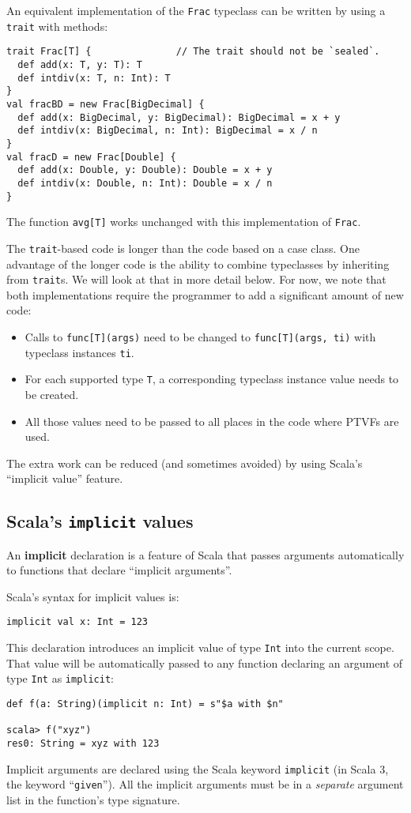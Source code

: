 An equivalent implementation of the \lstinline!Frac! typeclass can
be written by using a \lstinline!trait! with methods:
\begin{lstlisting}
trait Frac[T] {               // The trait should not be `sealed`.
  def add(x: T, y: T): T
  def intdiv(x: T, n: Int): T
}
val fracBD = new Frac[BigDecimal] {
  def add(x: BigDecimal, y: BigDecimal): BigDecimal = x + y
  def intdiv(x: BigDecimal, n: Int): BigDecimal = x / n
}
val fracD = new Frac[Double] {
  def add(x: Double, y: Double): Double = x + y
  def intdiv(x: Double, n: Int): Double = x / n
}
\end{lstlisting}
The function \lstinline!avg[T]! works unchanged with this implementation
of \lstinline!Frac!.

The \lstinline!trait!-based code is longer than the code based on
a case class. One advantage of the longer code is the ability to combine
typeclasses by inheriting from \lstinline!trait!s. We will look at
that in more detail below. For now, we note that both implementations
require the programmer to add a significant amount of new code:
\begin{itemize}
\item Calls to \lstinline!func[T](args)! need to be changed to \lstinline!func[T](args, ti)!
with typeclass instances \lstinline!ti!.
\item For each supported type \lstinline!T!, a corresponding typeclass
instance value needs to be created.
\item All those values need to be passed to all places in the code where
PTVFs are used.
\end{itemize}
The extra work can be reduced (and sometimes avoided) by using Scala\textsf{'}s
\textsf{``}implicit value\textsf{''} feature. 

\subsection{Scala\textsf{'}s \texttt{implicit} values}

An \textbf{implicit } declaration is a feature
of Scala that passes arguments automatically to functions that declare
\textsf{``}implicit arguments\textsf{''}.

Scala\textsf{'}s syntax for implicit values is:
\begin{lstlisting}
implicit val x: Int = 123
\end{lstlisting}
This declaration introduces an implicit value of type \lstinline!Int!
into the current scope. That value will be automatically passed to
any function declaring an argument of type \lstinline!Int! as \lstinline!implicit!:
\begin{lstlisting}
def f(a: String)(implicit n: Int) = s"$a with $n"

scala> f("xyz")
res0: String = xyz with 123
\end{lstlisting}
Implicit arguments are declared using the Scala keyword \lstinline!implicit!
(in Scala 3, the keyword \textsf{``}\lstinline!given!\textsf{''}). All the implicit
arguments must be in a \emph{separate} argument
list in the function\textsf{'}s type signature.

